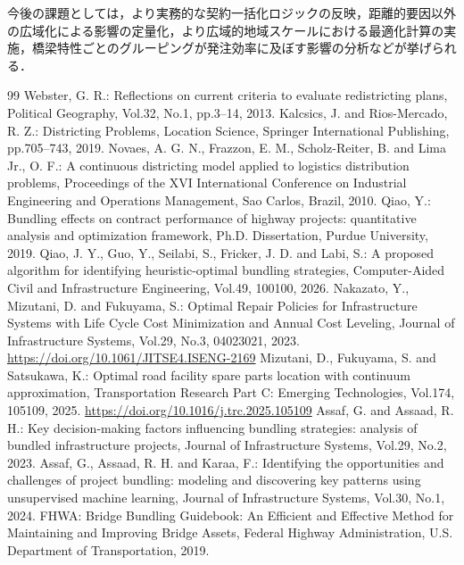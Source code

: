 \documentclass[Journal,letterpaper,InsideFigs,NoLineNumbers]{ascelike-new}
\begin{document}
今後の課題としては，より実務的な契約一括化ロジックの反映，距離的要因以外の広域化による影響の定量化，より広域的地域スケールにおける最適化計算の実施，橋梁特性ごとのグルーピングが発注効率に及ぼす影響の分析などが挙げられる．

\begin{thebibliography}{99}
Webster, G. R.: Reflections on current criteria to evaluate redistricting plans, Political Geography, Vol.32, No.1, pp.3--14, 2013.
Kalcsics, J. and Rios-Mercado, R. Z.: Districting Problems, Location Science, Springer International Publishing, pp.705--743, 2019.
Novaes, A. G. N., Frazzon, E. M., Scholz-Reiter, B. and Lima Jr., O. F.: A continuous districting model applied to logistics distribution problems, Proceedings of the XVI International Conference on Industrial Engineering and Operations Management, Sao Carlos, Brazil, 2010.
Qiao, Y.: Bundling effects on contract performance of highway projects: quantitative analysis and optimization framework, Ph.D. Dissertation, Purdue University, 2019.
Qiao, J. Y., Guo, Y., Seilabi, S., Fricker, J. D. and Labi, S.: A proposed algorithm for identifying heuristic-optimal bundling strategies, Computer-Aided Civil and Infrastructure Engineering, Vol.49, 100100, 2026.
Nakazato, Y., Mizutani, D. and Fukuyama, S.: Optimal Repair Policies for Infrastructure Systems with Life Cycle Cost Minimization and Annual Cost Leveling, Journal of Infrastructure Systems, Vol.29, No.3, 04023021, 2023. \url{https://doi.org/10.1061/JITSE4.ISENG-2169}
Mizutani, D., Fukuyama, S. and Satsukawa, K.: Optimal road facility spare parts location with continuum approximation, Transportation Research Part C: Emerging Technologies, Vol.174, 105109, 2025. \url{https://doi.org/10.1016/j.trc.2025.105109}
Assaf, G. and Assaad, R. H.: Key decision-making factors influencing bundling strategies: analysis of bundled infrastructure projects, Journal of Infrastructure Systems, Vol.29, No.2, 2023.
Assaf, G., Assaad, R. H. and Karaa, F.: Identifying the opportunities and challenges of project bundling: modeling and discovering key patterns using unsupervised machine learning, Journal of Infrastructure Systems, Vol.30, No.1, 2024.
FHWA: Bridge Bundling Guidebook: An Efficient and Effective Method for Maintaining and Improving Bridge Assets, Federal Highway Administration, U.S. Department of Transportation, 2019.

\end{thebibliography}
\end{document}
